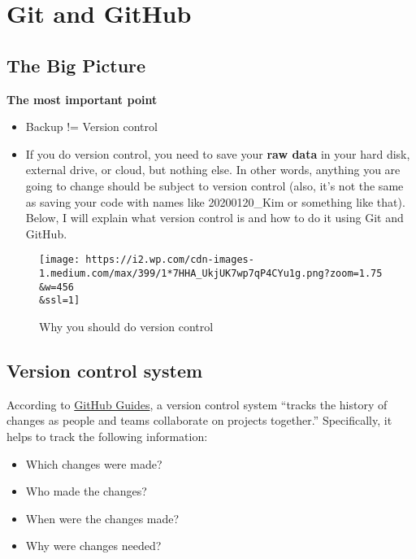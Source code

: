 \documentclass[
]{book}
\providecommand{\tightlist}{%
  \setlength{\itemsep}{0pt}\setlength{\parskip}{0pt}}
\begin{document}
\hypertarget{git-and-github}{%
\section{Git and GitHub}\label{git-and-github}}

\hypertarget{the-big-picture-1}{%
\subsection{The Big Picture}\label{the-big-picture-1}}

\textbf{The most important point}

\begin{itemize}
\item
  Backup != Version control
\item
  If you do version control, you need to save your \textbf{raw data} in your hard disk, external drive, or cloud, but nothing else. In other words, anything you are going to change should be subject to version control (also, it's not the same as saving your code with names like 20200120\_Kim or something like that). Below, I will explain what version control is and how to do it using Git and GitHub.
\end{itemize}

\begin{figure}
\centering
\texttt{[image: https://i2.wp.com/cdn-images-1.medium.com/max/399/1*7HHA\_UkjUK7wp7qP4CYu1g.png?zoom=1.75\\\&w=456\\\&ssl=1]}
\caption{Why you should do version control}
\end{figure}

\hypertarget{version-control-system}{%
\subsection{Version control system}\label{version-control-system}}

According to \href{https://guides.GitHub.com}{GitHub Guides}, a version control system ``tracks the history of changes as people and teams collaborate on projects together.'' Specifically, it helps to track the following information:

\begin{itemize}
\tightlist
\item
  Which changes were made?
\item
  Who made the changes?
\item
  When were the changes made?
\item
  Why were changes needed?
\end{itemize}
\end{document}
